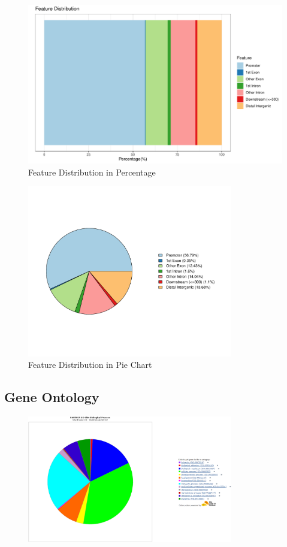 \documentclass[UTF8]{ctexart}
\begin{document}
\begin{figure}
	\centering
	\includegraphics[width=\textwidth]{img/peaks_feature_distribution.pdf}
    \caption{Feature Distribution in Percentage}
\end{figure}

\begin{figure}
	\centering
	\includegraphics[width=0.8\textwidth]{img/peaks_pie.pdf}
    \caption{Feature Distribution in Pie Chart}
\end{figure}


\subsection{Gene Ontology}

\begin{figure}[htb]
	\centering
	\includegraphics[width=0.8\textwidth]{img/GO_BioPro.png}
\end{figure}
\end{document}
